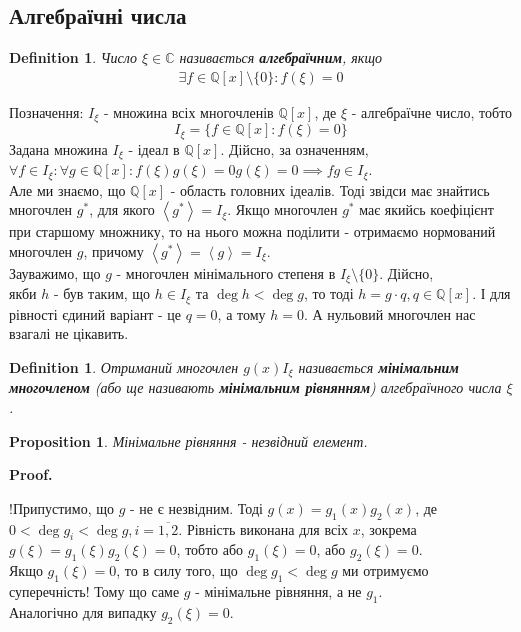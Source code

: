 \documentclass[a4paper, 10pt]{article}
\makeatletter
\theoremstyle{theoremdd}
\theoremstyle{theoremdd}
\newtheorem{definition}[theorem]{Definition}
\theoremstyle{theoremdd}
\theoremstyle{theoremdd}
\theoremstyle{theoremdd}
\newtheorem{proposition}[theorem]{Proposition}
\theoremstyle{theoremdd}
\theoremstyle{theoremdd}
\theoremstyle{theoremdd}
\renewenvironment{proof}[1][Proof.\\]{\par
\pushQED{\hfill \qed}%
\normalfont \topsep6\p@\@plus6\p@\relax
\trivlist
\item\relax
{\bfseries
#1\@addpunct{.}}\hspace\labelsep\ignorespaces
}{%
\popQED\endtrivlist\@endpefalse
}
\makeatother
\begin{document}
\subsection{Алгебраїчні числа}
\begin{definition}
Число $\xi \in \mathbb{C}$ називається \textbf{алгебраїчним}, якщо
\begin{align*}
\exists f \in \mathbb{Q}[x] \setminus \{0\}: f(\xi) = 0
\end{align*}
\end{definition}
Позначення: $I_\xi$ - множина всіх многочленів $\mathbb{Q}[x]$, де $\xi$ - алгебраїчне число, тобто
$$I_\xi = \{f \in \mathbb{Q}[x]: f(\xi) = 0\}$$
Задана множина $I_{\xi}$ - ідеал в $\mathbb{Q}[x]$. Дійсно, за означенням,\\
$\forall f \in I_{\xi}: \forall g \in \mathbb{Q}[x]: f(\xi)g(\xi) = 0 g(\xi) = 0 \implies fg \in I_{\xi}$.
\bigskip \\
Але ми знаємо, що $\mathbb{Q}[x]$ - область головних ідеалів. Тоді звідси має знайтись многочлен $g^*$, для якого $\left< g^* \right> = I_\xi$. Якщо многочлен $g^*$ має якийсь коефіцієнт при старшому множнику, то на нього можна поділити - отримаємо нормований многочлен $g$, причому $\left< g^* \right> = \left< g \right> = I_\xi$.
\bigskip \\
Зауважимо, що $g$ - многочлен мінімального степеня в $I_\xi \setminus \{0\}$. Дійсно,\\
якби $h$ - був таким, що $h \in I_\xi$ та $\deg h < \deg g$, то тоді $h = g \cdot q, q \in \mathbb{Q}[x]$. І для рівності єдиний варіант - це $q = 0$, а тому $h = 0$. А нульовий многочлен нас взагалі не цікавить.

\begin{definition}
Отриманий многочлен $g(x) I_\xi$ називається \textbf{мінімальним многочленом} (або ще називають \textbf{мінімальним рівнянням}) алгебраїчного числа $\xi$.
\end{definition}

\begin{proposition}
Мінімальне рівняння - незвідний елемент.
\end{proposition}

\begin{proof}
!Припустимо, що $g$ - не є незвідним. Тоді $g(x) = g_1(x)g_2(x)$, де \\ $0 < \deg g_{i} < \deg g, i = \overline{1,2}$. Рівність виконана для всіх $x$, зокрема\\
$g(\xi) = g_1(\xi) g_2(\xi) = 0$, тобто або $g_1(\xi) = 0$, або $g_2(\xi) = 0$.\\
Якщо $g_1(\xi) = 0$, то в силу того, що $\deg g_1 < \deg g$ ми отримуємо суперечність! Тому що саме $g$ - мінімальне рівняння, а не $g_1$.\\
Аналогічно для випадку $g_2(\xi) = 0$.
\end{proof}
\end{document}
